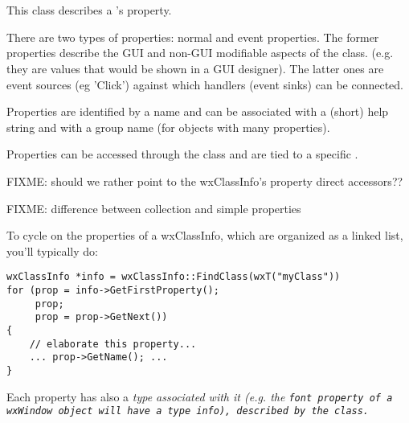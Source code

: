

\section{}\label{wxpropertyinfo}

This class describes a 's property.

There are two types of properties: normal and event properties.
The former properties describe the GUI and non-GUI modifiable aspects of the class.
(e.g. they are values that would be shown in a GUI designer).
The latter ones are event sources (eg 'Click') against which handlers (event sinks) can be connected.

Properties are identified by a name and can be associated with a (short) help string and with a group name
(for objects with many properties).

Properties can be accessed through the  class and
are tied to a specific .

FIXME: should we rather point to the wxClassInfo's property direct accessors??

FIXME: difference between collection and simple properties

To cycle on the properties of a wxClassInfo, which are organized as a linked list, you'll typically do:

\begin{verbatim}
wxClassInfo *info = wxClassInfo::FindClass(wxT("myClass"))
for (prop = info->GetFirstProperty();
     prop;
     prop = prop->GetNext())
{
    // elaborate this property...
    ... prop->GetName(); ...
}
\end{verbatim}

Each property has also a \it{type} associated with it (e.g. the \tt{font} property of a \tt{wxWindow}
object will have a  type info), described by the  class.



